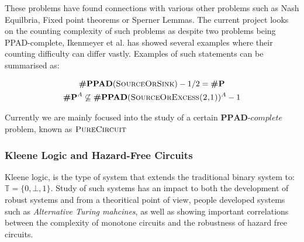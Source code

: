 

These problems have found
connections with various other problems such as Nash Equilbria,
Fixed point theorems or Sperner Lemmas. The current project looks
on the counting complexity of such problems as despite two problems
being PPAD-complete, Ikenmeyer et al. has showed several examples where
their counting difficulty can differ vastly. Examples of such statements
can be summarised as:

\begin{gather*}
    \textbf{\#PPAD}(\textsc{SourceOrSink})-1/2  = \textbf{\#P}\\
    \textbf{\#P}^A \not\subseteq \textbf{\#PPAD}(\textsc{SourceOrExcess(2,1)})^A-1
\end{gather*} 


Currently we are mainly focused into the study of a certain 
$\textbf{PPAD}\textit{-complete}$ problem, known as $\textsc{PureCircuit}$

\subsubsection{Kleene Logic and Hazard-Free Circuits}

Kleene logic, is the type of system that extends the traditional %
binary system to: $\mathbb{T} = \{0, \bot,1 \}$. 
Study of such systems has an impact to both
the development of robust systems and from a theoritical point of view,
people developed systems such as \textit{Alternative Turing mahcines}, as well as
showing important correlations between the complexity of monotone circuits
and the robustness of hazard free circuits. 
